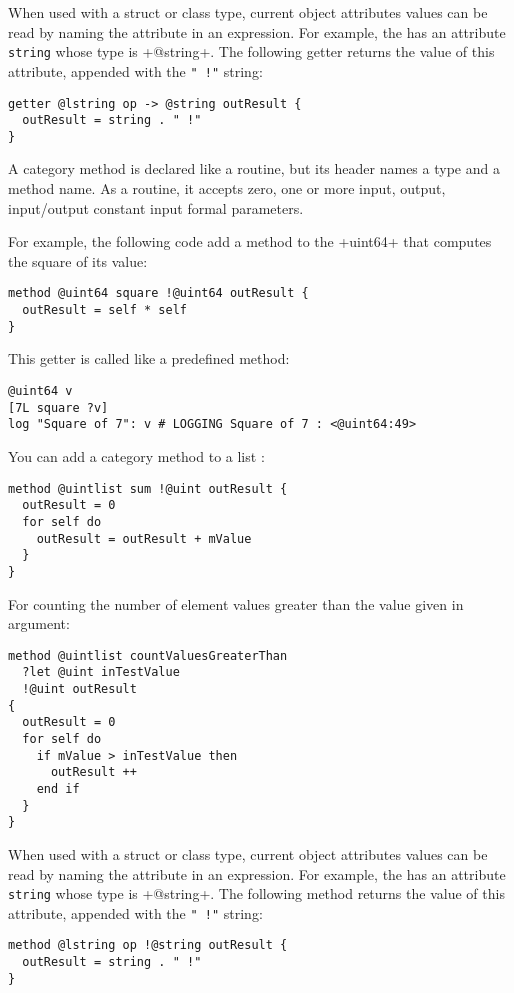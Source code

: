 When used with a struct or class type, current object attributes values can be read by naming the attribute in an expression. For example, the  has an attribute 
\lstinline[language=galgas]!string! whose type is \ggs+@string+. The following getter returns the value of this attribute, appended with the \lstinline[language=galgas]?" !"? string:
\begin{lstlisting}[language=galgas]
getter @lstring op -> @string outResult {
  outResult = string . " !"
}
\end{lstlisting}








A category method is declared like a routine, but its header names a type and a method name. As a routine, it accepts zero, one or more input, output, input/output constant input formal parameters.

For example, the following code add a method to the \ggs+uint64+ that computes the square of its value:
\begin{lstlisting}[language=galgas]
method @uint64 square !@uint64 outResult {
  outResult = self * self
}
\end{lstlisting}

This getter is called like a predefined method:
\begin{lstlisting}[language=galgas]
@uint64 v
[7L square ?v]
log "Square of 7": v # LOGGING Square of 7 : <@uint64:49>
\end{lstlisting}

You can add a category method to a list :
\begin{lstlisting}[language=galgas]
method @uintlist sum !@uint outResult {
  outResult = 0
  for self do
    outResult = outResult + mValue
  }
}
\end{lstlisting}

For counting the number of element values greater than the value given in argument:
\begin{lstlisting}[language=galgas]
method @uintlist countValuesGreaterThan
  ?let @uint inTestValue
  !@uint outResult
{
  outResult = 0
  for self do
    if mValue > inTestValue then
      outResult ++
    end if
  }
}
\end{lstlisting}

When used with a struct or class type, current object attributes values can be read by naming the attribute in an expression. For example, the  has an attribute 
\lstinline[language=galgas]!string! whose type is \ggs+@string+. The following method returns the value of this attribute, appended with the \lstinline[language=galgas]?" !"? string:
\begin{lstlisting}[language=galgas]
method @lstring op !@string outResult {
  outResult = string . " !"
}
\end{lstlisting}











